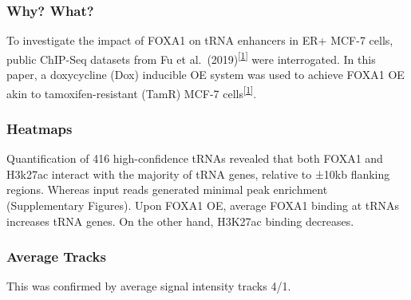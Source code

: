 \documentclass[
  12pt,
]{article}
\begin{document}
\hypertarget{why-what}{%
\subsubsection{Why? What?}\label{why-what}}

To investigate the impact of FOXA1 on tRNA enhancers in ER+ MCF-7 cells, public ChIP-Seq datasets from Fu et al.~(2019)\textsuperscript{{[}\protect\hyperlink{ref-fu2019}{1}{]}} were interrogated.
In this paper, a doxycycline (Dox) inducible OE system was used to achieve FOXA1 OE akin to tamoxifen-resistant (TamR) MCF-7 cells\textsuperscript{{[}\protect\hyperlink{ref-fu2019}{1}{]}}.

\hypertarget{heatmaps}{%
\subsubsection{Heatmaps}\label{heatmaps}}

Quantification of 416 high-confidence tRNAs revealed that both FOXA1 and H3k27ac interact with the majority of tRNA genes, relative to ±10kb flanking regions.
Whereas input reads generated minimal peak enrichment (Supplementary Figures).
Upon FOXA1 OE, average FOXA1 binding at tRNAs increases tRNA genes.
On the other hand, H3K27ac binding decreases.

\hypertarget{average-tracks}{%
\subsubsection{Average Tracks}\label{average-tracks}}

This was confirmed by average signal intensity tracks 4/1.
\end{document}
